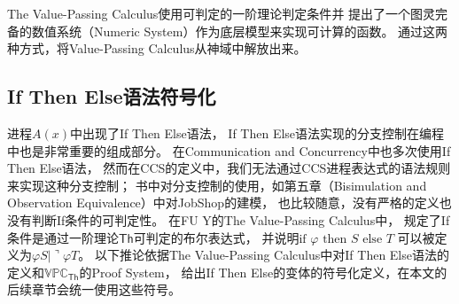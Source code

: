 The Value-Passing Calculus使用可判定的一阶理论判定条件\cite{PA}并
提出了一个图灵完备的数值系统（Numeric System）\cite{Fu_VPC}作为底层模型来实现可计算的函数。
通过这两种方式，将Value-Passing Calculus从神域中解放出来。

\subsection{If Then Else语法符号化}
进程$A(x)$中出现了If Then Else语法，
If Then Else语法实现的分支控制在编程中也是非常重要的组成部分。
在Communication and Concurrency\cite{Milner_CCS}中也多次使用If Then Else语法，
然而在CCS的定义中，我们无法通过CCS进程表达式的语法规则来实现这种分支控制；
书中对分支控制的使用，如第五章（Bisimulation and Observation Equivalence）中对JobShop的建模，
也比较随意，没有严格的定义也没有判断If条件的可判定性。
在FU Y的The Value-Passing Calculus中，
规定了If条件是通过一阶理论$\mathsf{Th}$可判定的布尔表达式，
并说明$\textrm{if }\varphi\textrm{ then }S\textrm{ else }T$
可以被定义为$\varphi S|\urcorner \varphi T$。
以下推论依据The Value-Passing Calculus中对If Then Else语法的定义和$\mathbb{VPC}_{\mathsf{Th}}$的Proof System，
给出If Then Else的变体的符号化定义，在本文的后续章节会统一使用这些符号。

